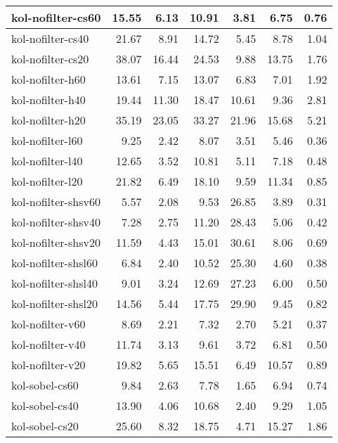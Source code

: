 \begin{tabular}{lrrrrrr}
\toprule
kol-nofilter-cs60   &   15.55 &    6.13 &   10.91 &    3.81 &    6.75 &    0.76 \\
\midrule
kol-nofilter-cs40   &   21.67 &    8.91 &   14.72 &    5.45 &    8.78 &    1.04 \\
kol-nofilter-cs20   &   38.07 &   16.44 &   24.53 &    9.88 &   13.75 &    1.76 \\
kol-nofilter-h60    &   13.61 &    7.15 &   13.07 &    6.83 &    7.01 &    1.92 \\
kol-nofilter-h40    &   19.44 &   11.30 &   18.47 &   10.61 &    9.36 &    2.81 \\
kol-nofilter-h20    &   35.19 &   23.05 &   33.27 &   21.96 &   15.68 &    5.21 \\
kol-nofilter-l60    &    9.25 &    2.42 &    8.07 &    3.51 &    5.46 &    0.36 \\
kol-nofilter-l40    &   12.65 &    3.52 &   10.81 &    5.11 &    7.18 &    0.48 \\
kol-nofilter-l20    &   21.82 &    6.49 &   18.10 &    9.59 &   11.34 &    0.85 \\
kol-nofilter-shsv60 &    5.57 &    2.08 &    9.53 &   26.85 &    3.89 &    0.31 \\
kol-nofilter-shsv40 &    7.28 &    2.75 &   11.20 &   28.43 &    5.06 &    0.42 \\
kol-nofilter-shsv20 &   11.59 &    4.43 &   15.01 &   30.61 &    8.06 &    0.69 \\
kol-nofilter-shsl60 &    6.84 &    2.40 &   10.52 &   25.30 &    4.60 &    0.38 \\
kol-nofilter-shsl40 &    9.01 &    3.24 &   12.69 &   27.23 &    6.00 &    0.50 \\
kol-nofilter-shsl20 &   14.56 &    5.44 &   17.75 &   29.90 &    9.45 &    0.82 \\
kol-nofilter-v60    &    8.69 &    2.21 &    7.32 &    2.70 &    5.21 &    0.37 \\
kol-nofilter-v40    &   11.74 &    3.13 &    9.61 &    3.72 &    6.81 &    0.50 \\
kol-nofilter-v20    &   19.82 &    5.65 &   15.51 &    6.49 &   10.57 &    0.89 \\
kol-sobel-cs60      &    9.84 &    2.63 &    7.78 &    1.65 &    6.94 &    0.74 \\
kol-sobel-cs40      &   13.90 &    4.06 &   10.68 &    2.40 &    9.29 &    1.05 \\
kol-sobel-cs20      &   25.60 &    8.32 &   18.75 &    4.71 &   15.27 &    1.86 \\

\end{tabular}
